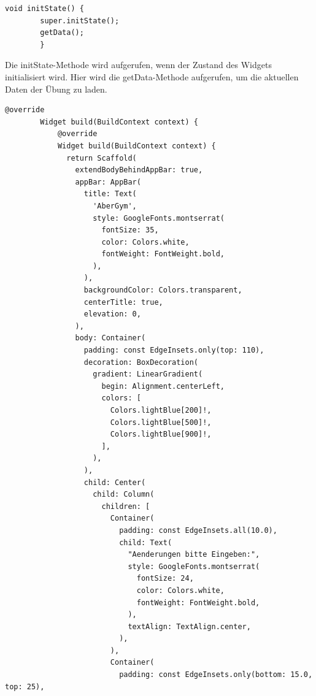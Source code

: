         \begin{lstlisting}[caption=Bearbeiten initState getData,label=lst:impl:frontend:qrcode]
        void initState() {
        super.initState();
        getData();
        }
        \end{lstlisting}
        
        Die initState-Methode wird aufgerufen, wenn der Zustand des Widgets initialisiert wird. Hier wird die getData-Methode aufgerufen, um die aktuellen Daten der Übung zu laden.
        \\

        \begin{lstlisting}[caption=Bearbeiten Build,label=lst:impl:frontend:qrcode]
        @override
        Widget build(BuildContext context) {
            @override
            Widget build(BuildContext context) {
              return Scaffold(
                extendBodyBehindAppBar: true,
                appBar: AppBar(
                  title: Text(
                    'AberGym',
                    style: GoogleFonts.montserrat(
                      fontSize: 35,
                      color: Colors.white,
                      fontWeight: FontWeight.bold,
                    ),
                  ),
                  backgroundColor: Colors.transparent,
                  centerTitle: true,
                  elevation: 0,
                ),
                body: Container(
                  padding: const EdgeInsets.only(top: 110),
                  decoration: BoxDecoration(
                    gradient: LinearGradient(
                      begin: Alignment.centerLeft,
                      colors: [
                        Colors.lightBlue[200]!,
                        Colors.lightBlue[500]!,
                        Colors.lightBlue[900]!,
                      ],
                    ),
                  ),
                  child: Center(
                    child: Column(
                      children: [
                        Container(
                          padding: const EdgeInsets.all(10.0),
                          child: Text(
                            "Aenderungen bitte Eingeben:",
                            style: GoogleFonts.montserrat(
                              fontSize: 24,
                              color: Colors.white,
                              fontWeight: FontWeight.bold,
                            ),
                            textAlign: TextAlign.center,
                          ),
                        ),
                        Container(
                          padding: const EdgeInsets.only(bottom: 15.0, top: 25),

\end{lstlisting}
